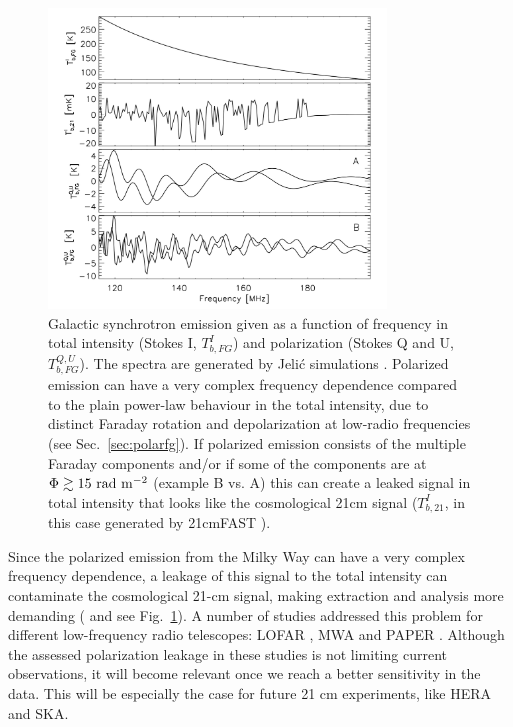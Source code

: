 \begin{figure}[!t]
   \centering	
   \includegraphics[width=0.8\textwidth]{Chapman_Jelic/Images/leakage.png}
    \caption{Galactic synchrotron emission given as a function of frequency in total intensity (Stokes I, $T^I_{b,FG}$) and polarization (Stokes Q and U, $T^{Q,U}_{b,FG}$). The spectra are generated by Jeli\'c simulations \cite{jelic10, jelic08}. Polarized emission can have a very complex frequency dependence compared to the plain power-law behaviour in the total intensity, due to distinct Faraday rotation and depolarization at low-radio frequencies (see Sec.~\ref{sec:polarfg}). If polarized emission consists of the multiple Faraday components and/or if some of the components are at $\Phi\gtrsim15~{\rm rad~m^{-2}}$ (example B vs. A) this can create a leaked signal in total intensity that looks like the cosmological 21cm signal ($T^I_{b,21}$, in this case generated by 21cmFAST \cite{mesinger11}).  }
\label{fig:leakage}
\end{figure}

Since the polarized emission from the Milky Way can have a very complex frequency dependence, a leakage of this signal to the total intensity can contaminate the cosmological 21-cm signal, making extraction and analysis more demanding (\cite{jelic10, moore13, spinelli18} and see Fig.~\ref{fig:leakage}). A number of studies addressed this problem for different low-frequency radio telescopes: LOFAR \cite{asad18, asad16, asad15},  MWA \cite{sutinjo15} and PAPER \cite{kohn16, nunhokee17}.  Although the assessed polarization leakage in these studies is not limiting current  observations, it will become relevant once we reach a better sensitivity in the data. This will be especially the case for future 21 cm experiments, like HERA and SKA. 

